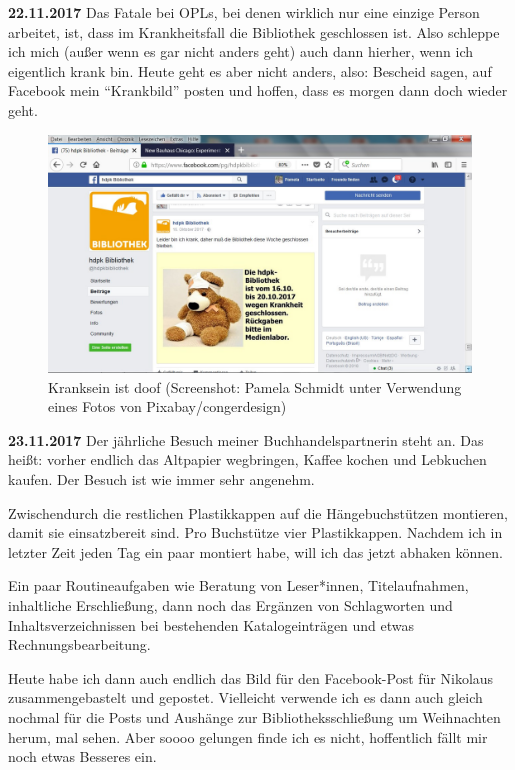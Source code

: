 \documentclass[a4paper,
fontsize=11pt,
oneside,
numbers=noperiodatend,
parskip=half-,
bibliography=totoc,
final
]{scrartcl}
\begin{document}
\textbf{22.11.2017} Das Fatale bei OPLs, bei denen wirklich nur eine
einzige Person arbeitet, ist, dass im Krankheitsfall die Bibliothek
geschlossen ist. Also schleppe ich mich (außer wenn es gar nicht anders
geht) auch dann hierher, wenn ich eigentlich krank bin. Heute geht es
aber nicht anders, also: Bescheid sagen, auf Facebook mein
\enquote{Krankbild} posten und hoffen, dass es morgen dann doch wieder
geht.

\begin{figure}
\centering
\includegraphics{img/Schmidt_2_b.jpg}
\caption{Kranksein ist doof (Screenshot: Pamela Schmidt unter Verwendung
eines Fotos von Pixabay/congerdesign)}
\end{figure}

\textbf{23.11.2017} Der jährliche Besuch meiner Buchhandelspartnerin
steht an. Das heißt: vorher endlich das Altpapier wegbringen, Kaffee
kochen und Lebkuchen kaufen. Der Besuch ist wie immer sehr angenehm.

Zwischendurch die restlichen Plastikkappen auf die Hängebuchstützen
montieren, damit sie einsatzbereit sind. Pro Buchstütze vier
Plastikkappen. Nachdem ich in letzter Zeit jeden Tag ein paar montiert
habe, will ich das jetzt abhaken können.

Ein paar Routineaufgaben wie Beratung von Leser*innen, Titelaufnahmen,
inhaltliche Erschließung, dann noch das Ergänzen von Schlagworten und
Inhaltsverzeichnissen bei bestehenden Katalogeinträgen und etwas
Rechnungsbearbeitung.

Heute habe ich dann auch endlich das Bild für den Facebook-Post für
Nikolaus zusammengebastelt und gepostet. Vielleicht verwende ich es dann
auch gleich nochmal für die Posts und Aushänge zur Bibliotheksschließung
um Weihnachten herum, mal sehen. Aber soooo gelungen finde ich es nicht,
hoffentlich fällt mir noch etwas Besseres ein.
\end{document}
